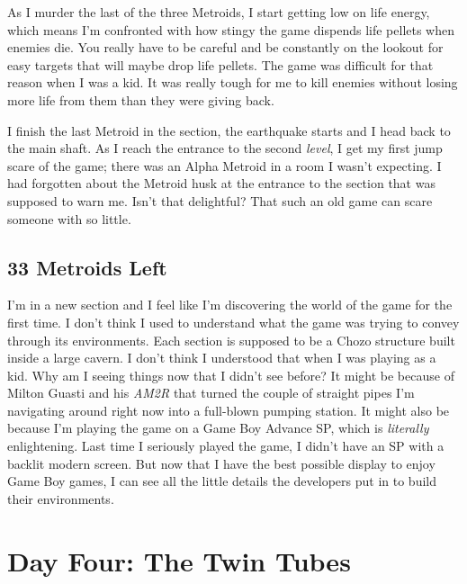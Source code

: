 \documentclass{book}
\begin{document}
As I murder the last of the three Metroids, I start getting low on life energy, which means I’m confronted with how stingy the game dispends life pellets when enemies die. You really have to be careful and be constantly on the lookout for easy targets that will maybe drop life pellets. The game was difficult for that reason when I was a kid. It was really tough for me to kill enemies without losing more life from them than they were giving back.

I finish the last Metroid in the section, the earthquake starts and I head back to the main shaft. As I reach the entrance to the second \emph{level}, I get my first jump scare of the game; there was an Alpha Metroid in a room I wasn’t expecting. I had forgotten about the Metroid husk at the entrance to the section that was supposed to warn me. Isn’t that delightful? That such an old game can scare someone with so little.

\subsection*{33 Metroids Left}\nopagebreak[4]

I’m in a new section and I feel like I’m discovering the world of the game for the first time. I don’t think I used to understand what the game was trying to convey through its environments. Each section is supposed to be a Chozo structure built inside a large cavern. I don’t think I understood that when I was playing as a kid. Why am I seeing things now that I didn’t see before? It might be because of Milton Guasti and his \emph{AM2R} that turned the couple of straight pipes I’m navigating around right now into a full-blown pumping station. It might also be because I’m playing the game on a Game Boy Advance SP, which is \emph{literally} enlightening. Last time I seriously played the game, I didn’t have an SP with a backlit modern screen. But now that I have the best possible display to enjoy Game Boy games, I can see all the little details the developers put in to build their environments.

\FloatBarrier\needspace{10mm}\section*{Day Four: The Twin Tubes}\nopagebreak[4]
\end{document}

